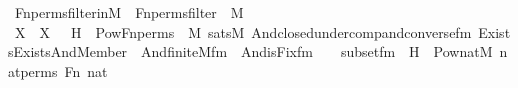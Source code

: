 \begin{isabellebody}
\isanewline
{}\isamarkupfalse%
\ Fn{\isacharunderscore}{\kern0pt}perms{\isacharunderscore}{\kern0pt}filter{\isacharunderscore}{\kern0pt}in{\isacharunderscore}{\kern0pt}M\ {\isacharcolon}{\kern0pt}\ {\isachardoublequoteopen}Fn{\isacharunderscore}{\kern0pt}perms{\isacharunderscore}{\kern0pt}filter\ {\isasymin}\ M{\isachardoublequoteclose}\ \isanewline
%
\isadelimproof
%
\endisadelimproof
%
\isatagproof
{}\isamarkupfalse%
\ {\isacharminus}{\kern0pt}\ \isanewline
\ \ \isamarkupfalse%
\ X\ \ {\isachardoublequoteopen}X\ {\isasymequiv}\ {\isacharbraceleft}{\kern0pt}\ H\ {\isasymin}\ Pow{\isacharparenleft}{\kern0pt}Fn{\isacharunderscore}{\kern0pt}perms{\isacharparenright}{\kern0pt}\ {\isasyminter}\ M{\isachardot}{\kern0pt}\ sats{\isacharparenleft}{\kern0pt}M{\isacharcomma}{\kern0pt}\ And{\isacharparenleft}{\kern0pt}closed{\isacharunderscore}{\kern0pt}under{\isacharunderscore}{\kern0pt}comp{\isacharunderscore}{\kern0pt}and{\isacharunderscore}{\kern0pt}converse{\isacharunderscore}{\kern0pt}fm{\isacharparenleft}{\kern0pt}{}{\isacharparenright}{\kern0pt}{\isacharcomma}{\kern0pt}\ Exists{\isacharparenleft}{\kern0pt}Exists{\isacharparenleft}{\kern0pt}And{\isacharparenleft}{\kern0pt}Member{\isacharparenleft}{\kern0pt}{}{\isacharcomma}{\kern0pt}\ {}{\isacharparenright}{\kern0pt}{\isacharcomma}{\kern0pt}\ And{\isacharparenleft}{\kern0pt}finite{\isacharunderscore}{\kern0pt}M{\isacharunderscore}{\kern0pt}fm{\isacharparenleft}{\kern0pt}{}{\isacharcomma}{\kern0pt}\ {}{\isacharparenright}{\kern0pt}{\isacharcomma}{\kern0pt}\ And{\isacharparenleft}{\kern0pt}is{\isacharunderscore}{\kern0pt}Fix{\isacharunderscore}{\kern0pt}fm{\isacharparenleft}{\kern0pt}{}{\isacharcomma}{\kern0pt}\ {}{\isacharcomma}{\kern0pt}\ {}{\isacharcomma}{\kern0pt}\ {}{\isacharparenright}{\kern0pt}{\isacharcomma}{\kern0pt}\ subset{\isacharunderscore}{\kern0pt}fm{\isacharparenleft}{\kern0pt}{}{\isacharcomma}{\kern0pt}\ {}{\isacharparenright}{\kern0pt}{\isacharparenright}{\kern0pt}{\isacharparenright}{\kern0pt}{\isacharparenright}{\kern0pt}{\isacharparenright}{\kern0pt}{\isacharparenright}{\kern0pt}{\isacharparenright}{\kern0pt}{\isacharcomma}{\kern0pt}\ {\isacharbrackleft}{\kern0pt}H{\isacharbrackright}{\kern0pt}\ {\isacharat}{\kern0pt}\ {\isacharbrackleft}{\kern0pt}Pow{\isacharparenleft}{\kern0pt}nat{\isacharparenright}{\kern0pt}{\isasyminter}M{\isacharcomma}{\kern0pt}\ nat{\isacharunderscore}{\kern0pt}perms{\isacharcomma}{\kern0pt}\ Fn{\isacharcomma}{\kern0pt}\ nat{\isacharbrackright}{\kern0pt}{\isacharparenright}{\kern0pt}\ {\isacharbraceright}{\kern0pt}{\isachardoublequoteclose}\ \isanewline

\end{isabellebody}
